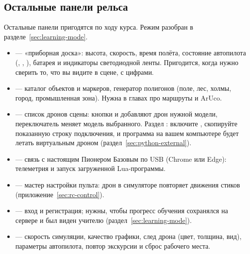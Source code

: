 \subsection{Остальные панели рельса}

Остальные панели пригодятся по ходу курса. Режим  разобран в разделе~\ref{sec:learning-mode}.

\begin{center}
\end{center}

\begin{itemize}
    \item {} --- «приборная доска»: высота, скорость, время полёта, состояние автопилота (, , ), батарея и индикаторы светодиодной ленты. Пригодится, когда нужно сверить то, что вы видите в сцене, с цифрами.
    \item {} --- каталог объектов и маркеров, генератор полигонов (поле, лес, холмы, город, промышленная зона). Нужна в главах про маршруты и ArUco.
    \item {} --- список дронов сцены: кнопки  и  добавляют дрон нужной модели, переключатель  меняет модель выбранного. Раздел : включите , скопируйте показанную строку подключения, и программа на вашем компьютере будет летать виртуальным дроном (раздел~\ref{sec:python-external}).
    \item {} --- связь с настоящим Пионером Базовым по USB (Chrome или Edge): телеметрия и запуск загруженной Lua-программы.
    \item {} --- мастер настройки пульта: дрон в симуляторе повторяет движения стиков (приложение~\ref{sec:rc-control}).
    \item {} --- вход и регистрация; нужны, чтобы прогресс обучения сохранялся на сервере и был виден учителю (раздел~\ref{sec:learning-mode}).
    \item {} --- скорость симуляции, качество графики, след дрона (цвет, толщина, вид), параметры автопилота, повтор экскурсии и сброс рабочего места.
\end{itemize}
